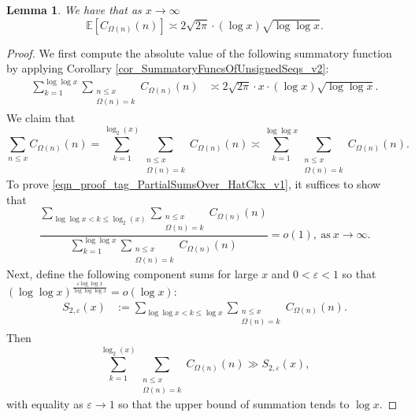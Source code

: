 \documentclass[11pt,reqno,a4letter]{article}
\numberwithin{figure}{section}
\numberwithin{table}{section}
\theoremstyle{plain}
\newtheorem{lemma}[theorem]{Lemma}
\numberwithin{theorem}{section}
\theoremstyle{definition}
\begin{document}
\begin{lemma} 
\label{lemma_HatCAstxSum_ExactFormulaWithError_v1} 
We have that as $x \rightarrow \infty$ 
\[
\mathbb{E}\left[C_{\Omega(n)}(n)\right] \asymp 2\sqrt{2\pi} \cdot (\log x) \sqrt{\log\log x}. 
\] 
\end{lemma} 
\begin{proof} 
We first compute the absolute value of the following 
summatory function by applying 
Corollary \ref{cor_SummatoryFuncsOfUnsignedSeqs_v2}:
\begin{align} 
\label{eqn_proof_tag_PartialSumsOver_HatCkx_v3} 
\sum_{k=1}^{\log\log x} \sum_{\substack{n \leq x \\ \Omega(n) = k}} C_{\Omega(n)}(n) & \asymp 
     2\sqrt{2\pi} \cdot x \cdot (\log x) \sqrt{\log\log x}. 
\end{align} 
We claim that 
\begin{equation} 
\label{eqn_proof_tag_PartialSumsOver_HatCkx_v1} 
\sum_{n \leq x} C_{\Omega(n)}(n) = 
     \sum_{k=1}^{\log_2(x)} \sum_{\substack{n \leq x \\ \Omega(n) = k}} C_{\Omega(n)}(n) \asymp 
     \sum_{k=1}^{\log\log x} \sum_{\substack{n \leq x \\ \Omega(n) = k}} C_{\Omega(n)}(n). 
\end{equation} 
To prove \eqref{eqn_proof_tag_PartialSumsOver_HatCkx_v1}, it suffices to show that 
\begin{equation} 
\label{eqn_proof_tag_PartialSumsOver_HatCkx_EquivCond_v2} 
\frac{\sum\limits_{\log\log x < k \leq \log_2(x)} \sum\limits_{\substack{n \leq x \\ \Omega(n) = k}} C_{\Omega(n)}(n)}{ 
     \sum\limits_{k=1}^{\log\log x} \sum\limits_{\substack{n \leq x \\ \Omega(n) = k}} C_{\Omega(n)}(n)} = o(1), 
     \mathrm{\ as\ } x \rightarrow \infty. 
\end{equation} 
Next, define the following component sums for large $x$ and $0 < \varepsilon < 1$ so that 
$(\log\log x)^{\frac{\varepsilon \log\log x}{\log\log\log x}} = o(\log x)$: 
\begin{align*} 
S_{2,\varepsilon}(x) & := \sum_{\log\log x < k \leq \log x} \sum_{\substack{n \leq x \\ \Omega(n) = k}} C_{\Omega(n)}(n). 
\end{align*} 
Then 
\[
\sum_{k=1}^{\log_2(x)} \sum_{\substack{n \leq x \\ \Omega(n) = k}} C_{\Omega(n)}(n) 
     \gg S_{2,\varepsilon}(x),  
\]
with equality as $\varepsilon \rightarrow 1$ so that the upper bound of summation tends to $\log x$. 

\end{proof}
\end{document}
